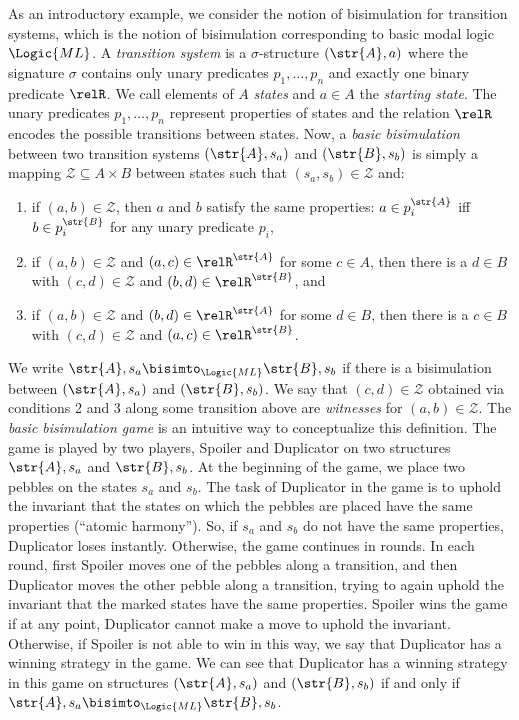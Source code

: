 As an introductory example, we consider the notion of bisimulation for transition systems, which is the notion of bisimulation corresponding to basic modal logic $\Logic{ML}$.
A \emph{transition system} is a $\sigma$-structure $(\str{A}, a)$ where the signature $\sigma$ contains only unary predicates $p_{1}, \ldots, p_{n}$ and exactly one binary predicate $\relR$.
We call elements of $A$ \emph{states} and $a \in A$ the \emph{starting state}.
The unary predicates $p_{1}, \ldots, p_{n}$ represent properties of states and the relation $\relR$ encodes the possible transitions between states.
Now, a \emph{basic bisimulation} between two transition systems $(\str{A},s_{a})$ and $(\str{B},s_{b})$ is simply a mapping $\mathcal{Z} \subseteq A \times B$ between states such that $(s_{a}, s_{b}) \in \mathcal{Z}$ and:
\begin{enumerate}
  \item if $(a,b) \in \mathcal{Z}$, then $a$ and $b$ satisfy the same properties: $a \in p_{i}^{\str{A}}$ iff $b \in p_{i}^{\str{B}}$ for any unary predicate $p_{i}$,
  \item if $(a,b) \in \mathcal{Z}$ and $(a,c) \in \relR^{\str{A}}$ for some $c \in A$, then there is a $d \in B$ with $(c,d) \in \mathcal{Z}$ and $(b,d) \in \relR^{\str{B}}$, and
  \item if $(a,b) \in \mathcal{Z}$ and $(b,d) \in \relR^{\str{A}}$ for some $d \in B$, then there is a $c \in B$ with $(c,d) \in \mathcal{Z}$ and $(a,c) \in \relR^{\str{B}}$.
\end{enumerate}
We write $\str{A}, s_{a} \bisimto_{\Logic{ML}} \str{B}, s_{b}$ if there is a bisimulation between $(\str{A}, s_{a})$ and $(\str{B}, s_{b})$.
We say that $(c,d) \in \mathcal{Z}$ obtained via conditions 2 and 3 along some transition above are \emph{witnesses} for $(a,b) \in \mathcal{Z}$.
The \emph{basic bisimulation game} is an intuitive way to conceptualize this definition.
The game is played by two players, Spoiler and Duplicator on two structures $\str{A}, s_{a}$ and $\str{B}, s_{b}$.
At the beginning of the game, we place two pebbles on the states $s_{a}$ and $s_{b}$.
The task of Duplicator in the game is to uphold the invariant that the states on which the pebbles are placed have the same properties (``atomic harmony'').
So, if $s_{a}$ and $s_{b}$ do not have the same properties, Duplicator loses instantly.
Otherwise, the game continues in rounds.
In each round, first Spoiler moves one of the pebbles along a transition, and then Duplicator moves the other pebble along a transition, trying to again uphold the invariant that the marked states have the same properties.
Spoiler wins the game if at any point, Duplicator cannot make a move to uphold the invariant.
Otherwise, if Spoiler is not able to win in this way, we say that Duplicator has a winning strategy in the game.
We can see that Duplicator has a winning strategy in this game on structures $(\str{A}, s_{a})$ and $(\str{B}, s_{b})$ if and only if $\str{A}, s_{a} \bisimto_{\Logic{ML}} \str{B}, s_{b}$.

